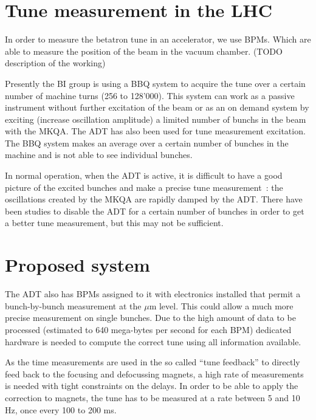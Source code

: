 \section{Tune measurement in the LHC}

In order to measure the betatron tune in an accelerator, we use \glspl{BPM}. Which are able to measure the position of the beam in the vacuum chamber. (TODO description of the working)

Presently the \gls{BI} group is using a \gls{BBQ} \cite{Boccardi:1156349} system to acquire the tune over a certain number of machine turns (256 to 128'000). This system can work as a passive instrument without further excitation of the beam or as an on demand system by exciting (increase oscillation amplitude) a limited number of \glspl{bunch} in the beam with the \gls{MKQA}. The \Gls{ADT} has also been used for tune measurement excitation\cite{HofleEvian10}. The \gls{BBQ} system makes an average over a certain number of bunches in the machine and is not able to see individual bunches.

In normal operation, when the \gls{ADT} is active, it is difficult to have a good picture of the excited bunches and make a precise tune measurement~: the oscillations created by the \gls{MKQA} are rapidly damped by the \gls{ADT}. There have been studies to disable the \gls{ADT} for a certain number of bunches in order to get a better tune measurement\cite{HofleEvian11}, but this may not be sufficient.

\section{Proposed system}

The \gls{ADT} also has \glspl{BPM} assigned to it with electronics installed that permit a bunch-by-bunch measurement at the $\mu$m level\cite{BphMeas07}. This could allow a much more precise measurement on single bunches. Due to the high amount of data to be processed (estimated to 640 mega-bytes per second for each \gls{BPM}) dedicated hardware is needed to compute the correct tune using all information available\cite{HofleChamonix12}.

As the time measurements are used in the so called ``tune feedback'' to directly feed back to the focusing and defocussing magnets, a high rate of measurements is needed with tight constraints on the delays. In order to be able to apply the correction to magnets, the \gls{tune} has to be measured at a rate between 5 and 10 Hz, once every 100 to 200 ms.

